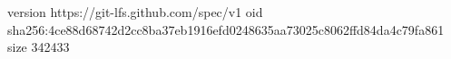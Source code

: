 version https://git-lfs.github.com/spec/v1
oid sha256:4ce88d68742d2cc8ba37eb1916efd0248635aa73025c8062ffd84da4c79fa861
size 342433
